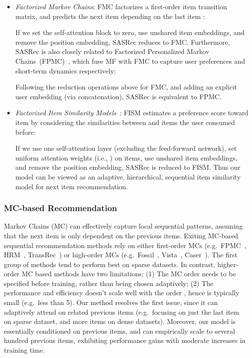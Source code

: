 \documentclass[conference]{IEEEtran}
\newcommand{\xhdr}[1]{\subsubsection*{\bf #1}}
\begin{document}
\begin{itemize}
\item \emph{Factorized Markov Chains}: FMC factorizes a first-order item transition matrix, and predicts the next item  depending on the last item :

If we set 
the
self-attention block to zero, use unshared item embeddings, and remove the position embedding, SASRec 
reduces
to FMC.
Furthermore, SASRec is also closely related to Factorized Personalized Markov Chains~(FPMC)~\cite{rendle2010fpmc}, which fuse MF with FMC to capture user preferences and short-term dynamics respectively:

Following the reduction operations above for FMC, and adding an explicit user embedding (via concatenation), SASRec is equivalent to FPMC.



\item \emph{Factorized Item Similarity Models~\cite{kabbur2013fism}}: FISM estimates a preference score 
toward
item  by considering the similarities between  and items the user consumed before:


If we use 
one
self-attention layer (excluding the feed-forward network), set uniform attention weights (i.e., ) on items, use unshared item embeddings, and remove the position embedding, SASRec is reduced to FISM. Thus our model can be viewed as an adaptive, hierarchical, sequential item similarity model for next item recommendation. 

\end{itemize}

\xhdr{MC-based Recommendation} Markov Chains (MC) can effectively capture local sequential patterns, 
assuming  that
the next item is only 
dependent
on the previous  items. Exiting MC-based sequential recommendation methods rely on either first-order MCs (e.g.~FPMC~\cite{rendle2010fpmc}, HRM~\cite{hrm}, TransRec~\cite{DBLP:conf/recsys/HeKM17}) or high-order MCs (e.g.~Fossil~\cite{DBLP:conf/icdm/HeM16}, Vista~\cite{DBLP:conf/recsys/HeFWM16}, Caser~\cite{DBLP:conf/wsdm/TangW18}). 
The first group of methods
tend to perform best on sparse datasets.
In contrast,
higher-order MC based methods
have two limitations: (1) The MC order  needs to be specified before 
training, 
rather than being chosen
adaptively; (2) The performance and efficiency doesn't scale well 
with the
order , 
hence  is typically small
(e.g.~less than 5). 
Our method 
resolves
the first issue, since it can adaptively attend on related previous items (e.g.~focusing on just the last item 
on sparse dataset, and 
more items on dense datasets). Moreover, our model is essentially conditioned on  previous items, and can empirically scale to 
several
hundred previous items,
exhibiting performance gains with moderate increases in training time.
\end{document}
